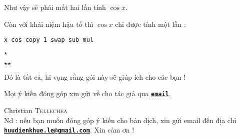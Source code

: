 \documentclass[a4paper,10pt]{article}
\newcommand\mywidth{0.85\linewidth}
\begin{document}
Như vậy sẽ phải mất hai lần tính $\cos x$.\smallskip

Còn với khái niệm hậu tố thì $\cos x$ chỉ được tính một lần :
\begin{center}
\begin{minipage}{\mywidth}
\begin{lstlisting}
x cos copy 1 swap sub mul
\end{lstlisting}
\end{minipage}
\end{center}


\bigskip
\begin{center}
$\star$\par
$\star$\quad$\star$
\end{center}

\bigskip
Đó là tất cả, hi vọng rằng gói này sẽ giúp ích cho các bạn !\par\nobreak
Mọi ý kiến đóng góp xin gửi về cho tác giả qua \href{mailto:unbonpetit@gmail.com}{\texttt{\textbf{email}}}.\par\nobreak\bigskip
Christian \textsc{Tellechea}\\

Nd : nếu bạn muốn đóng góp ý kiến cho bản dịch, xin gửi email đến địa chỉ \href{mailto:huudienkhue.le@gmail.com}{\texttt{\textbf{huudienkhue.le@gmail.com}}}. Xin cảm ơn !
\end{document}
